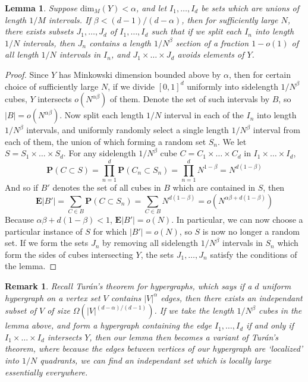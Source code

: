 \documentclass{report}
\theoremstyle{plain}
\newtheorem{lemma}{Lemma}
\theoremstyle{plain}
\newtheorem*{remark}{Remark}
\begin{document}
\begin{lemma}
    Suppose $\text{dim}_M(Y) < \alpha$, and let $I_1, \dots, I_d$ be sets which are unions of length $1/M$ intervals. If $\beta < (d - 1)/(d - \alpha)$, then for sufficiently large $N$, there exists subsets $J_1, \dots, J_d$ of $I_1, \dots, I_d$ such that if we split each $I_n$ into length $1/N$ intervals, then $J_n$ contains a length $1/N^\beta$ section of a fraction $1 - o(1)$ of all length $1/N$ intervals in $I_n$, and $J_1 \times \dots \times J_d$ avoids elements of $Y$.
\end{lemma}
\begin{proof}
    Since $Y$ has Minkowski dimension bounded above by $\alpha$, then for certain choice of sufficiently large $N$, if we divide $[0,1]^d$ uniformly into sidelength $1/N^\beta$ cubes, $Y$ intersects $o(N^{\alpha \beta})$ of them. Denote the set of such intervals by $B$, so $|B| = o(N^{\alpha \beta})$. Now split each length $1/N$ interval in each of the $I_n$ into length $1/N^\beta$ intervals, and uniformly randomly select a single length $1/N^\beta$ interval from each of them, the union of which forming a random set $S_n$. We let $S = S_1 \times \dots \times S_d$. For any sidelength $1/N^\beta$ cube $C = C_1 \times \dots \times C_d$ in $I_1 \times \dots \times I_d$,
    \[ \mathbf{P}(C \subset S) = \prod_{n = 1}^d \mathbf{P}(C_n \subset S_n) = \prod_{n = 1}^d N^{1 - \beta} = N^{d(1 - \beta)} \]
    And so if $B'$ denotes the set of all cubes in $B$ which are contained in $S$, then
    \[ \mathbf{E}|B'| = \sum_{C \in B} \mathbf{P}(C \subset S_n) = \sum_{C \in B} N^{d(1 - \beta)} = o \left( N^{\alpha \beta + d(1 - \beta)} \right) \]
    Because $\alpha \beta + d (1 - \beta) < 1$, $\mathbf{E}|B'| = o(N)$. In particular, we can now choose a particular instance of $S$ for which $|B'| = o(N)$, so $S$ is now no longer a random set. If we form the sets $J_n$ by removing all sidelength $1/N^\beta$ intervals in $S_n$ which form the sides of cubes intersecting $Y$, the sets $J_1, \dots, J_n$ satisfy the conditions of the lemma.
\end{proof}

\begin{remark}
    Recall Tur\'{a}n's theorem for hypergraphs, which says if a $d$ uniform hypergraph on a vertex set $V$ contains $|V|^\alpha$ edges, then there exists an independant subset of $V$ of size $\Omega(|V|^{(d - \alpha)/(d-1)})$. If we take the length $1/N^\beta$ cubes in the lemma above, and form a hypergraph containing the edge $I_1, \dots, I_d$ if and only if $I_1 \times \dots \times I_d$ intersects $Y$, then our lemma then becomes a variant of Tur\'{a}n's theorem, where because the edges between vertices of our hypergraph are `localized' into $1/N$ quadrants, we can find an independant set which is locally large essentially everywhere.
\end{remark}
\end{document}
